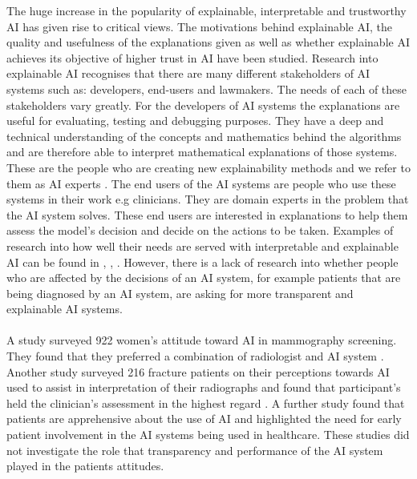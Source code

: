 \documentclass[manuscript,screen,review]{acmart}
\begin{document}
The huge increase in the popularity of explainable, interpretable and trustworthy AI has given rise to critical views. The motivations behind explainable AI, the quality \cite{Doshi-Velez2017} and usefulness of the explanations given \cite{Miller2019} as well as whether explainable AI achieves its objective of higher trust in AI \cite{Lipton2018} have been studied. Research into explainable AI recognises that there are many different stakeholders of AI systems such as: developers, end-users and lawmakers. The needs of each of these stakeholders vary greatly. For the developers of AI systems the explanations are useful for evaluating, testing and debugging purposes. They have a deep and technical understanding of the concepts and mathematics behind the algorithms and are therefore able to interpret mathematical explanations of those systems. These are the people who are creating new explainability methods and we refer to them as AI experts \cite{Carvalho2019}. The end users of the AI systems are people who use these systems in their work e.g clinicians. They are domain experts in the problem that the AI system solves. These end users are interested in explanations to help them assess the model’s decision and decide on the actions to be taken. Examples of research into how well their needs are served with interpretable and explainable AI can be found in \cite{Goldstein2021}, \cite{Liao2020}, \cite{Salimiparsa2021}. However, there is a lack of research into whether people who are affected by the decisions of an AI system, for example patients that are being diagnosed by an AI system, are asking for more transparent and explainable AI systems.\\\\

A study surveyed 922 women’s attitude toward AI in mammography screening. They found that they preferred a combination of radiologist and AI system \cite{Ongena2021}. Another study surveyed 216 fracture patients on their perceptions towards AI used to assist in interpretation of their radiographs and found that participant’s held the clinician’s assessment in the highest regard \cite{York2020}. A further study found that patients are apprehensive about the use of AI \cite{Richardson2021} and highlighted the need for early patient involvement in the AI systems being used in healthcare. These studies did not investigate the role that transparency and performance of the AI system played in the patients attitudes.\\\\
\end{document}
